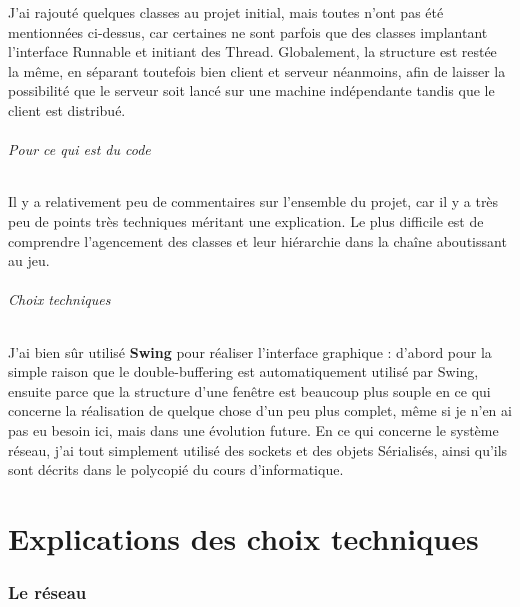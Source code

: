 \documentclass[a4paper,12pt]{report}
\begin{document}
J'ai rajouté quelques classes au projet initial, mais toutes n'ont pas été mentionnées ci-dessus, car certaines ne sont parfois que des classes implantant l'interface Runnable et initiant des Thread. Globalement, la structure est restée la même, en séparant toutefois bien client et serveur néanmoins, afin de laisser la possibilité que le serveur soit lancé sur une machine indépendante tandis que le client est distribué.

\paragraph{Pour ce qui est du code}

Il y a relativement peu de commentaires sur l'ensemble du projet, car il y a très peu de points très techniques méritant une explication. Le plus difficile est de comprendre l'agencement des classes et leur hiérarchie dans la chaîne aboutissant au jeu.

\paragraph{Choix techniques}

J'ai bien sûr utilisé \textbf{Swing} pour réaliser l'interface graphique : d'abord pour la simple raison que le double-buffering est automatiquement utilisé par Swing, ensuite parce que la structure d'une fenêtre est beaucoup plus souple en ce qui concerne la réalisation de quelque chose d'un peu plus complet, même si je n'en ai pas eu besoin ici, mais dans une évolution future. En ce qui concerne le système réseau, j'ai tout simplement utilisé des sockets et des objets Sérialisés, ainsi qu'ils sont décrits dans le polycopié du cours d'informatique.

\part{Explications des choix techniques}




\section{Le réseau}

\paragraph{}
\end{document}
